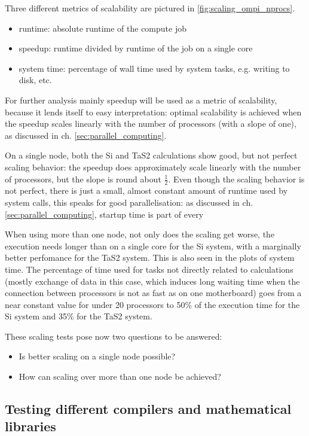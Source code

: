 \documentclass[main.tex]{subfiles}
\begin{document}

Three different metrics of scalability are pictured in \ref{fig:scaling_ompi_nprocs}.
\begin{itemize}
    \item runtime: absolute runtime of the compute job
    \item speedup: runtime divided by runtime of the job on a single core
    \item system time: percentage of wall time used by system tasks, e.g. writing to disk, etc.
\end{itemize}
For further analysis mainly speedup will be used as a metric of scalability, because it lends itself to easy interpretation: optimal scalability is achieved when the speedup scales linearly with the number of processors (with a slope of one), as discussed in ch. \ref{sec:parallel_computing}.

On a single node, both the Si and TaS2 calculations show good, but not perfect scaling behavior: the speedup does approximately scale linearly with the number of processors, but the slope is round about \(\frac{1}{2}\).
Even though the scaling behavior is not perfect, there is just a small, almost constant amount of runtime used by system calls, this speaks for good parallelisation: as discussed in ch. \ref{sec:parallel_computing}, startup time is part of every 

When using more than one node, not only does the scaling get worse, the execution needs longer than on a single core for the Si system, with a marginally better perfomance for the TaS2 system.
This is also seen in the plots of system time. The percentage of time used for tasks not directly related to calculations (mostly exchange of data in this case, which induces long waiting time when the connection between processors is not as fast as on one motherboard) goes from a near constant value for under 20 processors to 50\% of the execution time for the Si system and 35\% for the TaS2 system.

These scaling tests pose now two questions to be answered:
\begin{itemize}
    \item Is better scaling on a single node possible?
    \item How can scaling over more than one node be achieved?
\end{itemize}

\subsection{Testing different compilers and mathematical libraries}
\end{document}

